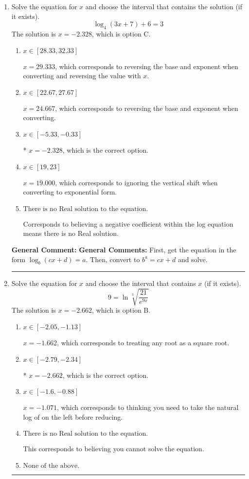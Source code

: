 \documentclass{extbook}[14pt]
\newcommand{\litem}[1]{\item #1

\rule{\textwidth}{0.4pt}}
\begin{document}
\begin{enumerate}\litem{
Solve the equation for $x$ and choose the interval that contains the solution (if it exists).
\[ \log_{4}{(3x+7)}+6 = 3 \]The solution is \( x = -2.328 \), which is option C.\begin{enumerate}[label=\Alph*.]
\item \( x \in [28.33, 32.33] \)

$x = 29.333$, which corresponds to reversing the base and exponent when converting and reversing the value with $x$.
\item \( x \in [22.67, 27.67] \)

$x = 24.667$, which corresponds to reversing the base and exponent when converting.
\item \( x \in [-5.33, -0.33] \)

* $x = -2.328$, which is the correct option.
\item \( x \in [19, 23] \)

$x = 19.000$, which corresponds to ignoring the vertical shift when converting to exponential form.
\item \( \text{There is no Real solution to the equation.} \)

Corresponds to believing a negative coefficient within the log equation means there is no Real solution.
\end{enumerate}

\textbf{General Comment:} \textbf{General Comments:} First, get the equation in the form $\log_b{(cx+d)} = a$. Then, convert to $b^a = cx+d$ and solve.
}
\litem{
 Solve the equation for $x$ and choose the interval that contains $x$ (if it exists).
\[  9 = \ln{\sqrt[3]{\frac{21}{e^{9x}}}} \]The solution is \( x = -2.662 \), which is option B.\begin{enumerate}[label=\Alph*.]
\item \( x \in [-2.05, -1.13] \)

$x = -1.662$, which corresponds to treating any root as a square root.
\item \( x \in [-2.79, -2.34] \)

* $x = -2.662$, which is the correct option.
\item \( x \in [-1.6, -0.88] \)

$x = -1.071$, which corresponds to thinking you need to take the natural log of on the left before reducing.
\item \( \text{There is no Real solution to the equation.} \)

This corresponds to believing you cannot solve the equation.
\item \( \text{None of the above.} \)


\end{enumerate}}
\end{enumerate}
\end{document}
